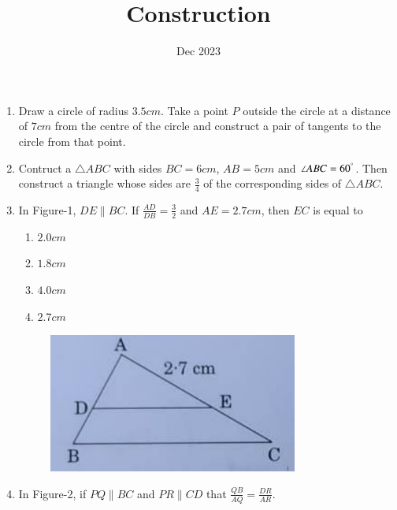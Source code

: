 \documentclass[12pt,-letter paper]{article}
\title{Construction}
\date{Dec 2023}
\begin{document}
\maketitle
\begin{enumerate}
	\item Draw a circle of radius $3.5 cm$. Take a point $P$ outside the circle at a distance of $7 cm$ from the centre of the circle and construct a pair of tangents to the circle from that point.
	\item Contruct a $\triangle ABC $ with sides $BC = 6 cm$, $AB = 5 cm$ and $\angle ABC = 60^\degree$. Then construct a triangle whose sides are $\frac{3}{4}$ of the corresponding sides of $\triangle ABC$.
	\item In Figure-1, $DE \parallel BC $. If $\frac{AD}{DB}=\frac{3}{2}$ and $AE = 2.7 cm$, then $EC$ is equal to
		\begin{enumerate}
		\item $2.0 cm$ 
                \item $1.8 cm$
		\item $4.0 cm$
		\item $2.7 cm$
		\end{enumerate}
		\begin{figure}[!ht]
			\begin{center}
				\includegraphics[width=\columnwidth]{figs/Construction-1.jpg}
			\end{center}
			\caption{}
			\label{fig:Construction-1.jpg}
		\end{figure}
		\newpage
	\item In Figure-2, if $PQ \parallel BC$ and $PR \parallel CD$ that $\frac{QB}{AQ} = \frac{DR}{AR}$.
		\begin{figure}[!ht]
                        \begin{center}

\end{center}
\end{figure}
\end{enumerate}
\end{document}
